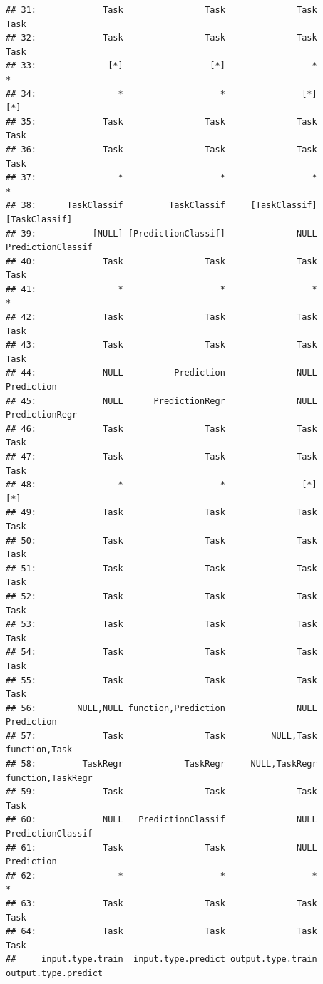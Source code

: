 \documentclass[
]{scrbook}
\begin{document}
\begin{verbatim}
## 31:             Task                Task              Task                Task
## 32:             Task                Task              Task                Task
## 33:              [*]                 [*]                 *                   *
## 34:                *                   *               [*]                 [*]
## 35:             Task                Task              Task                Task
## 36:             Task                Task              Task                Task
## 37:                *                   *                 *                   *
## 38:      TaskClassif         TaskClassif     [TaskClassif]       [TaskClassif]
## 39:           [NULL] [PredictionClassif]              NULL   PredictionClassif
## 40:             Task                Task              Task                Task
## 41:                *                   *                 *                   *
## 42:             Task                Task              Task                Task
## 43:             Task                Task              Task                Task
## 44:             NULL          Prediction              NULL          Prediction
## 45:             NULL      PredictionRegr              NULL      PredictionRegr
## 46:             Task                Task              Task                Task
## 47:             Task                Task              Task                Task
## 48:                *                   *               [*]                 [*]
## 49:             Task                Task              Task                Task
## 50:             Task                Task              Task                Task
## 51:             Task                Task              Task                Task
## 52:             Task                Task              Task                Task
## 53:             Task                Task              Task                Task
## 54:             Task                Task              Task                Task
## 55:             Task                Task              Task                Task
## 56:        NULL,NULL function,Prediction              NULL          Prediction
## 57:             Task                Task         NULL,Task       function,Task
## 58:         TaskRegr            TaskRegr     NULL,TaskRegr   function,TaskRegr
## 59:             Task                Task              Task                Task
## 60:             NULL   PredictionClassif              NULL   PredictionClassif
## 61:             Task                Task              NULL          Prediction
## 62:                *                   *                 *                   *
## 63:             Task                Task              Task                Task
## 64:             Task                Task              Task                Task
##     input.type.train  input.type.predict output.type.train output.type.predict
\end{verbatim}
\end{document}

